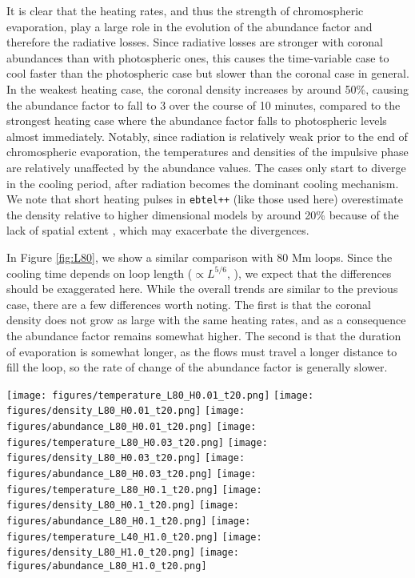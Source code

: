 \documentclass[twocolumn]{aastex631}
\begin{document}
It is clear that the heating rates, and thus the strength of chromospheric evaporation, play a large role in the evolution of the abundance factor and therefore the radiative losses.  Since radiative losses are stronger with coronal abundances than with photospheric ones, this causes the time-variable case to cool faster than the photospheric case but slower than the coronal case in general.  In the weakest heating case, the coronal density increases by around 50\%, causing the abundance factor to fall to 3 over the course of 10 minutes, compared to the strongest heating case where the abundance factor falls to photospheric levels almost immediately.  Notably, since radiation is relatively weak prior to the end of chromospheric evaporation, the temperatures and densities of the impulsive phase are relatively unaffected by the abundance values.  The cases only start to diverge in the cooling period, after radiation becomes the dominant cooling mechanism.  We note that short heating pulses in \texttt{ebtel++} (like those used here) overestimate the density relative to higher dimensional models by around 20\% because of the lack of spatial extent \citep{barnes2016}, which may exacerbate the divergences.


In Figure \ref{fig:L80}, we show a similar comparison with 80 Mm loops.  Since the cooling time depends on loop length ($\propto L^{5/6}$, \citealt{cargill1995}), we expect that the differences should be exaggerated here.  While the overall trends are similar to the previous case, there are a few differences worth noting.  The first is that the coronal density does not grow as large with the same heating rates, and as a consequence the abundance factor remains somewhat higher.  The second is that the duration of evaporation is somewhat longer, as the flows must travel a longer distance to fill the loop, so the rate of change of the abundance factor is generally slower.  
\begin{figure*}
    \centering
    \texttt{[image: figures/temperature\_L80\_H0.01\_t20.png]}
    \texttt{[image: figures/density\_L80\_H0.01\_t20.png]}
    \texttt{[image: figures/abundance\_L80\_H0.01\_t20.png]}
    \texttt{[image: figures/temperature\_L80\_H0.03\_t20.png]}
    \texttt{[image: figures/density\_L80\_H0.03\_t20.png]}
    \texttt{[image: figures/abundance\_L80\_H0.03\_t20.png]}
    \texttt{[image: figures/temperature\_L80\_H0.1\_t20.png]}
    \texttt{[image: figures/density\_L80\_H0.1\_t20.png]}
    \texttt{[image: figures/abundance\_L80\_H0.1\_t20.png]}
    \texttt{[image: figures/temperature\_L40\_H1.0\_t20.png]}
    \texttt{[image: figures/density\_L80\_H1.0\_t20.png]}
    \texttt{[image: figures/abundance\_L80\_H1.0\_t20.png]}
    \caption{Similar to Figure \ref{fig:L40}, showing the results for an 80 Mm loop heated impulsively for 20 s.  \label{fig:L80}}
\end{figure*}
\end{document}
